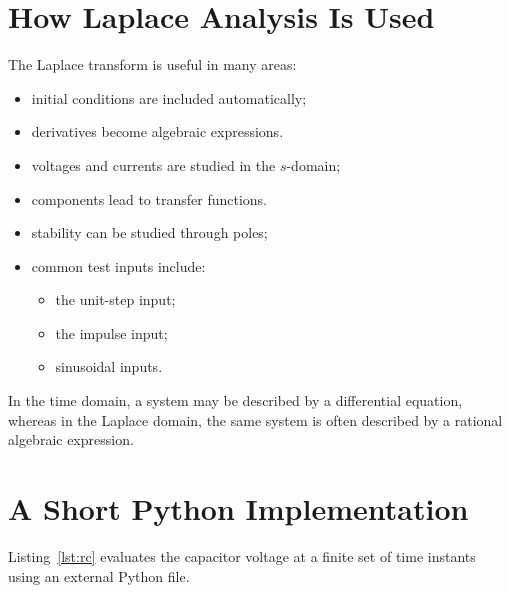 \documentclass[10pt]{article}
\begin{document}
\section{How Laplace Analysis Is Used}
The Laplace transform is useful in many areas:

\begin{description}[leftmargin=0pt, style=nextline]
  \item[Differential equations]
    \begin{itemize}[label=$\oplus$]
      \item initial conditions are included automatically;
      \item derivatives become algebraic expressions.
    \end{itemize}
  \item[Electrical circuits]
    \begin{itemize}[label=$\oplus$]
      \item voltages and currents are studied in the $s$-domain;
      \item components lead to transfer functions.
    \end{itemize}
  \item[Control and signal systems]
    \begin{itemize}[label=$\oplus$]
      \item stability can be studied through poles;
      \item common test inputs include:
        \begin{itemize}[label=$\triangleright$]
          \item the unit-step input;
          \item the impulse input;
          \item sinusoidal inputs.
        \end{itemize}
    \end{itemize}
\end{description}

In the time domain, a system may be described by a differential equation,
whereas in the Laplace domain, the same system is often described by a
rational algebraic expression.

\section{A Short Python Implementation}
Listing~\ref{lst:rc} evaluates the capacitor voltage at a finite set of
time instants using an external Python file.
\end{document}
